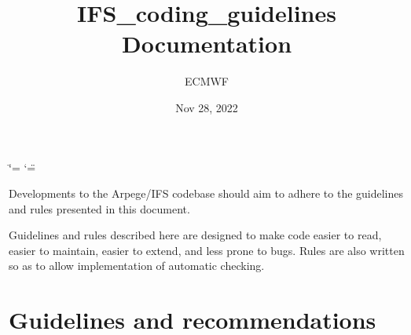 \documentclass[letterpaper,10pt,english]{sphinxmanual}
\title{IFS\_coding\_guidelines Documentation}
\date{Nov 28, 2022}
\author{ECMWF}
\begin{document}
\ifdefined\shorthandoff
  \ifnum\catcode`\=\string=\active\shorthandoff{=}\fi
  \ifnum\catcode`\"=\active{}\fi
\fi

\pagestyle{empty}
\sphinxmaketitle
\pagestyle{plain}
\sphinxtableofcontents
\pagestyle{normal}
\label{\detokenize{index::doc}}


\sphinxAtStartPar
Developments to the Arpege/IFS codebase should aim to adhere to the guidelines
and rules presented in this document.

\sphinxAtStartPar
Guidelines and rules described here are designed to make code easier to read,
easier to maintain, easier to extend, and less prone to bugs.
Rules are also written so as to allow implementation of automatic checking.


\chapter{Guidelines and recommendations}
\end{document}

